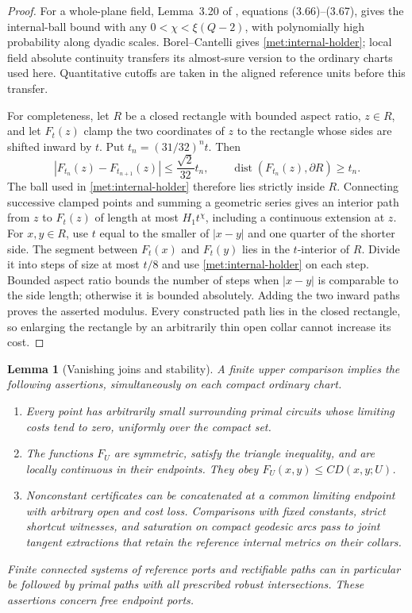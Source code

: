 \documentclass[11pt]{article}
\numberwithin{equation}{section}
\newtheorem{lemma}[theorem]{Lemma}
\theoremstyle{definition}
\theoremstyle{remark}
\newcommand{\1}{\mathbf 1}
\begin{document}
\begin{proof}
For a whole-plane field, Lemma~3.20 of \cite{DubedatEtAlWeakMetric}, equations
(3.66)--(3.67), gives the internal-ball bound with any
$0<\chi<\xi(Q-2)$, with polynomially high probability along dyadic
scales.  Borel--Cantelli gives \eqref{met:internal-holder}; local field
absolute continuity transfers its almost-sure version to the ordinary
charts used here.  Quantitative cutoffs are taken in the aligned
reference units before this transfer.

For completeness, let $R$ be a closed rectangle with bounded aspect
ratio, $z\in R$, and let $F_t(z)$ clamp the two coordinates of $z$ to
the rectangle whose sides are shifted inward by $t$.  Put
$t_n=(31/32)^nt$.  Then
\[
 |F_{t_n}(z)-F_{t_{n+1}}(z)|\leq \frac{\sqrt2}{32}t_n,
 \qquad \operatorname{dist}(F_{t_n}(z),\partial R)\geq t_n.
\]
The ball used in \eqref{met:internal-holder} therefore lies strictly
inside $R$.  Connecting successive clamped points and summing a
geometric series gives an interior path from $z$ to $F_t(z)$ of length
at most $H_1t^\chi$, including a continuous extension at $z$.  For
$x,y\in R$, use $t$ equal to the smaller of $|x-y|$ and one quarter of
the shorter side.  The segment between $F_t(x)$ and $F_t(y)$ lies in the
$t$-interior of $R$.  Divide it into steps of size at most $t/8$ and use
\eqref{met:internal-holder} on each step.  Bounded aspect ratio bounds
the number of steps when $|x-y|$ is comparable to the side length;
otherwise it is bounded absolutely.  Adding the two inward paths
proves the asserted modulus.  Every constructed path lies in the
closed rectangle, so enlarging the rectangle by an arbitrarily thin
open collar cannot increase its cost.
\end{proof}

\begin{lemma}[Vanishing joins and stability]
\label{met:vanishing-joins}
A finite upper comparison implies the following assertions,
simultaneously on each compact ordinary chart.
\begin{enumerate}
\item Every point has arbitrarily small surrounding primal circuits
whose limiting costs tend to zero, uniformly over the compact set.
\item The functions $F_U$ are symmetric, satisfy the triangle
inequality, and are locally continuous in their endpoints.  They obey
$F_U(x,y)\leq C D(x,y;U)$.
\item Nonconstant certificates can be concatenated at a common
limiting endpoint with arbitrary open and cost loss.  Comparisons with
fixed constants, strict shortcut witnesses, and saturation on compact
geodesic arcs pass to joint tangent extractions that retain the
reference internal metrics on their collars.
\end{enumerate}
Finite connected systems of reference ports and rectifiable paths can
in particular be followed by primal paths with all prescribed robust
intersections.  These assertions concern free endpoint ports.
\end{lemma}
\end{document}
